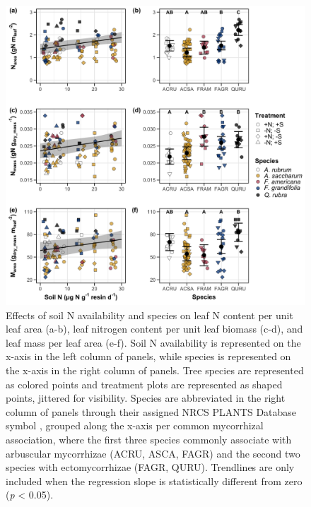 \newpage
\begin{figure}
    \includegraphics[scale = 0.055]{ch3_NxpH/figs/NxS_fig1_leafn.png}
    \centering
    \caption[Effects of soil N availability and species on leaf N content per unit leaf area, leaf nitrogen content per unit leaf biomass, and leaf mass per leaf area]{Effects of soil N availability and species on leaf N content per unit leaf area (a-b), leaf nitrogen content per unit leaf biomass (c-d), and leaf mass per leaf area (e-f). Soil N availability is represented on the x-axis in the left column of panels, while species is represented on the x-axis in the right column of panels. Tree species are represented as colored points and treatment plots are represented as shaped points, jittered for visibility. Species are abbreviated in the right column of panels through their assigned NRCS PLANTS Database symbol , grouped along the x-axis per common mycorrhizal association, where the first three species commonly associate with arbuscular mycorrhizae (ACRU, ASCA, FAGR) and the second two species with ectomycorrhizae (FAGR, QURU). Trendlines are only included when the regression slope is statistically different from zero (\textit{p} < 0.05).}
    \label{fig:figure3.1}
\end{figure}
\clearpage

\newpage
